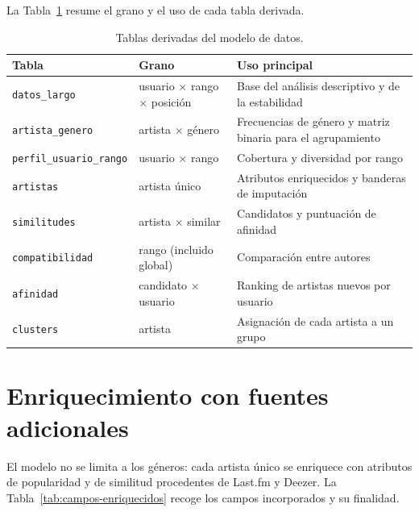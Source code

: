 La Tabla~\ref{tab:tablas-derivadas} resume el grano y el uso de cada tabla derivada.

\begin{table}[H]
    \centering
    \caption{Tablas derivadas del modelo de datos.}
    \label{tab:tablas-derivadas}
    \small
    \begin{tabular}{|p{}|p{}|p{}|}
        \hline
        \textbf{Tabla} & \textbf{Grano} & \textbf{Uso principal} \\
        \hline
        \texttt{datos\_largo} & usuario $\times$ rango $\times$ posición & Base del análisis descriptivo y de la estabilidad \\
        \hline
        \texttt{artista\_genero} & artista $\times$ género & Frecuencias de género y matriz binaria para el agrupamiento \\
        \hline
        \nolinkurl{perfil_usuario_rango} & usuario $\times$ rango & Cobertura y diversidad por rango \\
        \hline
        \texttt{artistas} & artista único & Atributos enriquecidos y banderas de imputación \\
        \hline
        \texttt{similitudes} & artista $\times$ similar & Candidatos y puntuación de afinidad \\
        \hline
        \texttt{compatibilidad} & rango (incluido global) & Comparación entre autores \\
        \hline
        \texttt{afinidad} & candidato $\times$ usuario & Ranking de artistas nuevos por usuario \\
        \hline
        \texttt{clusters} & artista & Asignación de cada artista a un grupo \\
        \hline
    \end{tabular}
\end{table}

\section{Enriquecimiento con fuentes adicionales}
\label{sec:enriquecimiento}

El modelo no se limita a los géneros: cada artista único se enriquece con atributos de popularidad y de similitud procedentes de Last.fm y Deezer. La Tabla~\ref{tab:campos-enriquecidos} recoge los campos incorporados y su finalidad.

